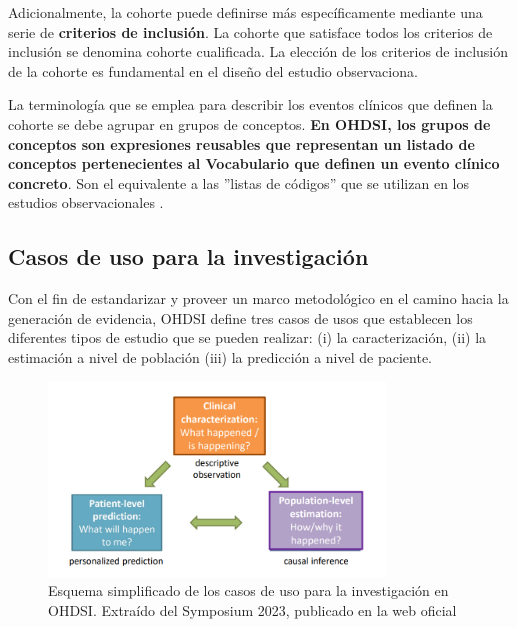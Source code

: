 Adicionalmente, la cohorte puede definirse más específicamente mediante una serie de \textbf{criterios de inclusión}. La cohorte que satisface todos los criterios de inclusión se denomina cohorte cualificada. La elección de los criterios de inclusión de la cohorte es fundamental en el diseño del estudio observaciona.

La terminología que se emplea para describir los eventos clínicos que definen la cohorte se debe agrupar en grupos de conceptos. \textbf{En OHDSI, los grupos de conceptos son expresiones reusables que representan un listado de conceptos pertenecientes al Vocabulario que definen un evento clínico concreto}.  Son el equivalente a las ''listas de códigos'' que se utilizan en los estudios observacionales \parencite{OHDSIbook}.

\subsection{Casos de uso para la investigación} \label{subsec:05casosUso}

Con el fin de estandarizar y proveer un marco metodológico en el camino hacia la generación de evidencia, OHDSI define tres casos de usos que establecen los diferentes tipos de estudio que se pueden realizar: (i) la caracterización, (ii) la estimación a nivel de población (iii) la predicción a nivel de paciente.

\begin{figure}[H]
\centering
\includegraphics[width=0.80\textwidth]{figures/useCases.png}
     \caption{Esquema simplificado de los casos de uso para la investigación en OHDSI. Extraído del Symposium 2023, publicado en la web oficial \parencite{OHDSIwebsite}}
    \label{fig:useCases}
\end{figure}


